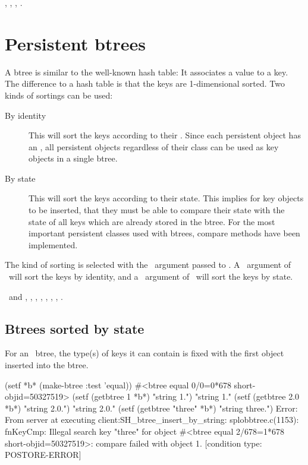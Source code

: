 {}, ,
,
.

\section{Persistent btrees}%
\label{sec:PersistentBTree}

A btree is similar to the well-known hash table: It associates a value
to a key. The difference to a hash table is that the keys are
1-dimensional sorted. Two kinds of sortings can be used:
\begin{description}

\item[By identity] This will sort the keys according to their
  \objid[s]. Since each persistent object has an \objid, all
  persistent objects regardless of their class can be used as key
  objects in a single btree.

\item[By state] This will sort the keys according to their state. This
  implies for key objects to be inserted, that they must be able to
  compare their state with the state of all keys which are already
  stored in the btree. For the most important persistent classes used
  with btrees, compare methods have been implemented.

\end{description}
The kind of sorting is selected with the \ argument
passed to . A \ argument of \ 
will sort the keys by identity, and a \ argument of
\lisp{equal}\ will sort the keys by state.

 {}\ and ,
, , ,
, ,
, .

\subsection{Btrees sorted by state}

For an \ btree, the type(s) of keys it can contain is
fixed with the first object inserted into the btree.
\begin{IndentedCompactCode}
\listener{}(setf *b* (make-btree :test 'equal))
#<btree equal 0/0=0*678 short-objid=50327519>
\listener{}(setf (getbtree 1 *b*) "string 1.")\marginnumber{\smalloi}
"string 1."
\listener{}(setf (getbtree 2.0 *b*) "string 2.0.")\marginnumber{\smalloii}
"string 2.0."
\listener{}(setf (getbtree "three" *b*) "string three.")\marginnumber{\smalloiii}
Error: From server at executing client:SH_btree_insert_by_string:
       splobbtree.c(1153): fnKeyCmp:
       Illegal search key "three" for
       object #<btree equal 2/678=1*678 short-objid=50327519>:
       compare failed with
       object 1.
  [condition type: POSTORE-ERROR]
\end{IndentedCompactCode}

